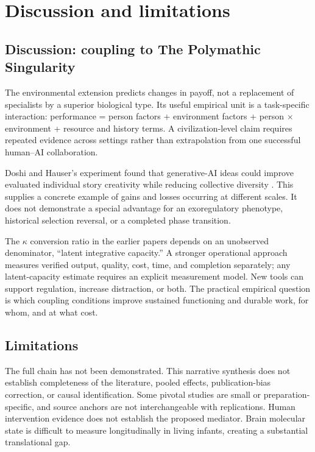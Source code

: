 \section{Discussion and limitations}

\subsection{Discussion: coupling to The Polymathic Singularity}

The environmental extension predicts changes in payoff, not a replacement of specialists by a superior biological type. Its useful empirical unit is a task-specific interaction: performance = person factors + environment factors + person \ensuremath{\times} environment + resource and history terms. A civilization-level claim requires repeated evidence across settings rather than extrapolation from one successful human–AI collaboration.

Doshi and Hauser's experiment found that generative-AI ideas could improve evaluated individual story creativity while reducing collective diversity \cite{ref21}. This supplies a concrete example of gains and losses occurring at different scales. It does not demonstrate a special advantage for an exoregulatory phenotype, historical selection reversal, or a completed phase transition.

The \ensuremath{\kappa} conversion ratio in the earlier papers depends on an unobserved denominator, “latent integrative capacity.” A stronger operational approach measures verified output, quality, cost, time, and completion separately; any latent-capacity estimate requires an explicit measurement model. New tools can support regulation, increase distraction, or both. The practical empirical question is which coupling conditions improve sustained functioning and durable work, for whom, and at what cost.


\subsection{Limitations}

The full chain has not been demonstrated. This narrative synthesis does not establish completeness of the literature, pooled effects, publication-bias correction, or causal identification. Some pivotal studies are small or preparation-specific, and source anchors are not interchangeable with replications. Human intervention evidence does not establish the proposed mediator. Brain molecular state is difficult to measure longitudinally in living infants, creating a substantial translational gap.

